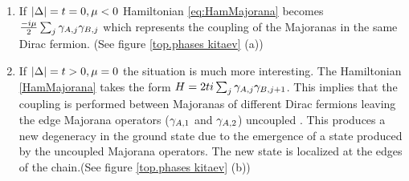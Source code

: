 \begin{enumerate}
\item{If $\vert \Delta \vert = t = 0, \mu <0$} Hamiltonian \eqref{eq:HamMajorana} becomes $\frac{-i\mu}{2} \sum_{j} \gamma_{A,j}\gamma_{B,j}$ which represents the coupling of the Majoranas in the same Dirac fermion. (See figure \ref{top.phases kitaev} (a))

\item{If $\vert \Delta \vert = t > 0, \mu =0$} the situation is much more interesting. The Hamiltonian \eqref{HamMajorana} takes the form $H = 2ti\sum_{j} \gamma_{A,j}\gamma_{B,j+1}$. This implies that the coupling is performed between  Majoranas of different Dirac fermions leaving the edge Majorana operators ($\gamma_{A,1}$ and $\gamma_{A,2}$) uncoupled . This produces a new degeneracy in the ground state due to the emergence of a state produced by the uncoupled Majorana operators. The new state is localized at the edges of the chain.(See figure \ref{top.phases kitaev} (b)) 
\end{enumerate}



